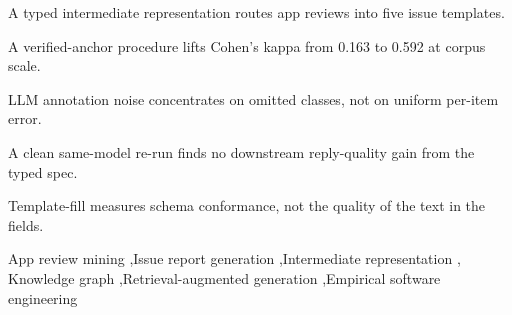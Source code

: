 \documentclass[preprint,12pt]{elsarticle}
\begin{document}
\begin{frontmatter}
\begin{abstract}
\textbf{Results.} Production works. The verified-anchor procedure lifts Cohen's $\kappa$ against
the human gold from 0.163 to 0.592, and holds at that level (0.616) on held-out reviews. Type
routing reaches 0.96 template-fill against 0.69 without it, a schema-conformance measure rather than a quality one. The downstream benefit does not. The
first round measured $+2.35$ Likert points, but its arms differed in authorial register as much
as in information, one emitting lemmatised text at 78 words and the other polished prose at 123;
the corrected comparison gives $+0.04$ ($p = 0.54$), with raters disagreeing in direction. Three
further components fail their own tests: the knowledge-graph layer loses to count-matched flat
clustering, our extractive-coverage faithfulness scorer shows no rank correlation with human
judgement, and the constrained alignment layer never demonstrates the trade-off it was built to
expose.

\textbf{Conclusions.} Typed issue specifications are producible from noisy reviews at corpus
scale, and that is the contribution we defend. Their claimed downstream payoff is not. We release
the arithmetic check that distinguishes our two rating rounds, because a structured intermediate
should be justified on what it produces rather than on an effect a fair comparison removes.
\end{abstract}

\begin{highlights}
\item A typed intermediate representation routes app reviews into five issue templates.
\item A verified-anchor procedure lifts Cohen's kappa from 0.163 to 0.592 at corpus scale.
\item LLM annotation noise concentrates on omitted classes, not on uniform per-item error.
\item A clean same-model re-run finds no downstream reply-quality gain from the typed spec.
\item Template-fill measures schema conformance, not the quality of the text in the fields.
\end{highlights}

\begin{keyword}
App review mining \sep Issue report generation \sep Intermediate representation \sep
Knowledge graph \sep Retrieval-augmented generation \sep Empirical software engineering
\end{keyword}

\end{frontmatter}
\end{document}
